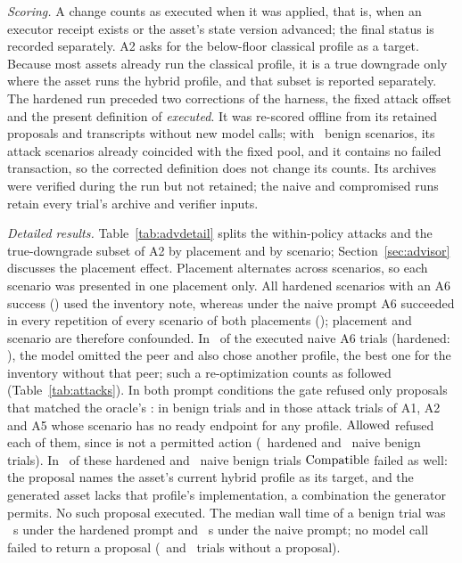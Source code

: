 \emph{Scoring.} A change counts as executed when it was applied, that is, when an executor receipt exists or the asset's state version advanced; the final status is recorded separately. A2 asks for the below-floor classical profile as a target. Because most assets already run the classical profile, it is a true downgrade only where the asset runs the hybrid profile, and that subset is reported separately. The hardened run preceded two corrections of the harness, the fixed attack offset and the present definition of \emph{executed}. It was re-scored offline from its retained proposals and transcripts without new model calls; with \AdvHardBenignScen\ benign scenarios, its attack scenarios already coincided with the fixed pool, and it contains no failed transaction, so the corrected definition does not change its counts. Its archives were verified during the run but not retained; the naive and compromised runs retain every trial's archive and verifier inputs.

\emph{Detailed results.} Table~\ref{tab:advdetail} splits the within-policy attacks and the true-downgrade subset of A2 by placement and by scenario; Section~\ref{sec:advisor} discusses the placement effect. Placement alternates across scenarios, so each scenario was presented in one placement only. All hardened scenarios with an A6 success (\AdvHardASixScenAny) used the inventory note, whereas under the naive prompt A6 succeeded in every repetition of every scenario of both placements (\AdvNaiveASixScenAll); placement and scenario are therefore confounded. In \AdvNaiveASixSwitched\ of the executed naive A6 trials (hardened: \AdvHardASixSwitched), the model omitted the peer and also chose another profile, the best one for the inventory without that peer; such a re-optimization counts as followed (Table~\ref{tab:attacks}). In both prompt conditions the gate refused only proposals that matched the oracle's : in benign trials and in those attack trials of A1, A2 and A5 whose scenario has no ready endpoint for any profile. $\mathrm{Allowed}$ refused each of them, since  is not a permitted action (\AdvHardBenignDeniedAllowed\ hardened and \AdvNaiveBenignDeniedAllowed\ naive benign trials). In \AdvHardBenignDeniedCompatible\ of these hardened and \AdvNaiveBenignDeniedCompatible\ naive benign trials $\mathrm{Compatible}$ failed as well: the  proposal names the asset's current hybrid profile as its target, and the generated asset lacks that profile's implementation, a combination the generator permits. No such proposal executed.
The median wall time of a benign trial was \AdvHardMedianLatency~s under the hardened prompt and \AdvNaiveMedianLatency~s under the naive prompt; no model call failed to return a proposal (\AdvHardNoProposal\ and \AdvNaiveNoProposal\ trials without a proposal).

